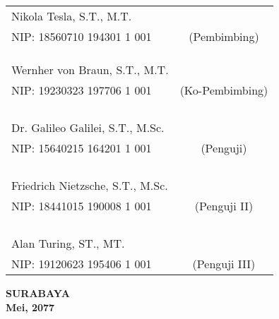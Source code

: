     \noindent
    \begin{tabularx}{\textwidth}{X c}
      Nikola Tesla, S.T., M.T.          & \\
      NIP: 18560710 194301 1 001        & (Pembimbing)\\
      &  \\                             
      &  \\ 
      &  \\                             
      Wernher von Braun, S.T., M.T.     & \\
      NIP: 19230323 197706 1 001        & (Ko-Pembimbing)\\
      &  \\                             & \\
      &  \\
      &  \\
      Dr. Galileo Galilei, S.T., M.Sc.  & \\
      NIP: 15640215 164201 1 001        & (Penguji)\\
      &  \\                             & \\
      &  \\
      &  \\
      Friedrich Nietzsche, S.T., M.Sc.  & \\
      NIP: 18441015 190008 1 001        & (Penguji II)\\
      &  \\                             & \\ 
      &  \\
      &  \\
      Alan Turing, ST., MT.             & \\
      NIP: 19120623 195406 1 001        & (Penguji III)\\
    \end{tabularx}
  \endgroup

  \vspace{4ex}

  \begin{center}
    \textbf{SURABAYA} \\
    \textbf{Mei, 2077}
  \end{center}
\endgroup
